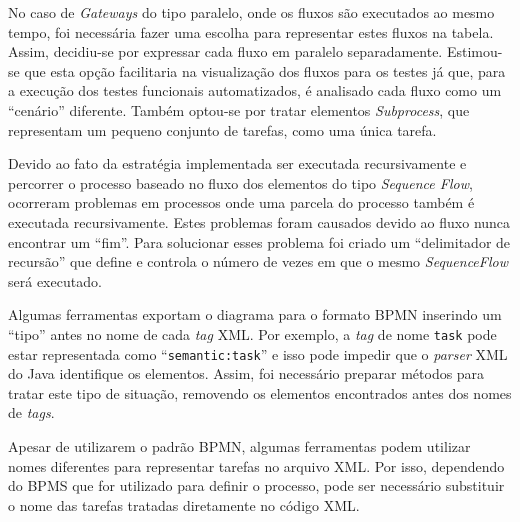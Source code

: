 \documentclass[12pt]{article}
\begin{document}
No caso de \emph{Gateways} do tipo paralelo, onde os fluxos são executados ao mesmo tempo, foi necessária fazer uma escolha para representar estes fluxos na tabela. Assim, decidiu-se por expressar cada fluxo em paralelo separadamente. Estimou-se que esta opção facilitaria na visualização dos fluxos para os testes já que, para a execução dos testes funcionais automatizados, é analisado cada fluxo como um ``cenário'' diferente. Também optou-se por tratar elementos \emph{Subprocess}, que representam um pequeno conjunto de tarefas, como uma única tarefa.


Devido ao fato da estratégia implementada ser executada recursivamente e percorrer o processo baseado no fluxo dos elementos do tipo \emph{Sequence Flow}, ocorreram problemas em processos onde uma parcela do processo também é executada recursivamente. Estes problemas foram causados devido ao fluxo nunca encontrar um ``fim''. Para solucionar esses problema foi criado um ``delimitador de recursão'' que define e controla o número de vezes em que o mesmo \emph{SequenceFlow} será executado.

Algumas ferramentas exportam o diagrama para o formato BPMN inserindo um ``tipo'' antes no nome de cada \emph{tag} XML. Por exemplo, a \emph{tag} de nome \texttt{task} pode estar representada como ``\texttt{semantic:task}'' e isso pode impedir que o \emph{parser} XML do Java identifique os elementos. Assim, foi necessário preparar métodos para tratar este tipo de situação, removendo os elementos encontrados antes dos nomes de \emph{tags}.

Apesar de utilizarem o padrão BPMN, algumas ferramentas podem utilizar nomes diferentes para representar tarefas no arquivo XML. Por isso, dependendo do BPMS que for utilizado para definir o processo, pode ser necessário substituir o nome das tarefas tratadas diretamente no código XML.

\end{document}
